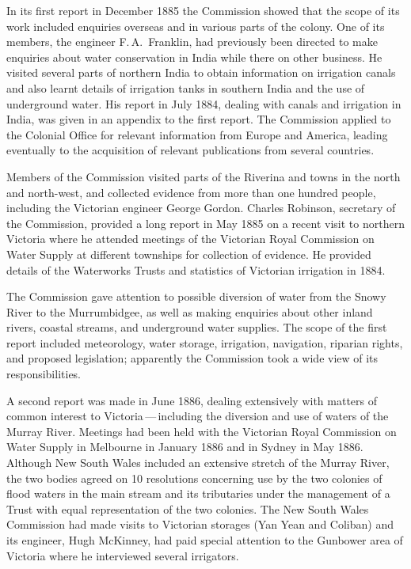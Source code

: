 In its first report in December 1885 the Commission showed that the
scope of its work included enquiries overseas and in various parts of
the colony.  One of its members, the engineer F.\,A.~Franklin,
 had previously been directed to make enquiries
about water conservation in India while there on other business.  He
visited several parts of northern India to obtain information on
irrigation canals and also learnt details of
irrigation tanks in southern India and the use of underground water.
His report in July 1884, dealing with canals and irrigation in India,
 was given in an appendix to the first report.  The
Commission applied to the Colonial Office for relevant information
from Europe and America, leading
eventually to the acquisition of relevant publications from several
countries.

Members of the Commission visited parts of the Riverina and towns in
the north and north-west, and collected evidence from more than one
hundred people, including the Victorian engineer George
Gordon.   Charles Robinson, 
secretary of the Commission, provided a long report in May 1885 on a
recent visit to northern Victoria where he attended meetings of the
Victorian Royal Commission on Water Supply at different townships for
collection of evidence. He provided details of the Waterworks Trusts
and statistics of Victorian irrigation in 1884.

The Commission gave attention to possible diversion of water from the
Snowy River  to the Murrumbidgee,
 as well as making
enquiries about other inland rivers, coastal streams, and underground
water supplies.  The scope of the first report included meteorology,
water storage, irrigation, navigation, riparian
rights, and proposed legislation; apparently the Commission took a
wide view of its responsibilities.

A second report was made in June 1886, dealing extensively with
matters of common interest to Victoria\,---\,including the diversion
and use of waters of the Murray River.   Meetings
had been held with the Victorian Royal Commission on Water Supply in
Melbourne in January 1886 and in Sydney in May 1886.  Although New
South Wales included an extensive stretch of the Murray River, the two
bodies agreed on 10 resolutions concerning use by the two colonies of
flood waters in the main stream and its tributaries under the
management of a Trust with equal representation of the two colonies.
The New South Wales Commission had made visits to Victorian storages
(Yan Yean and Coliban) 
 and its engineer, Hugh McKinney,
 had paid special attention to the Gunbower area 
of Victoria where he interviewed several irrigators.

